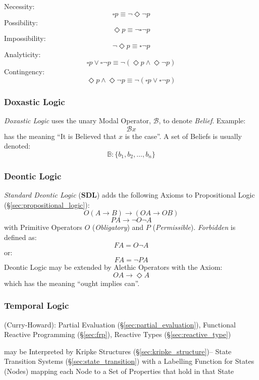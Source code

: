 Necessity:
\[
  \square p \equiv \neg \Diamond \neg p
\]
Possibility:
\[
  \Diamond p \equiv \neg \square \neg p
\]
Impossibility:
\[
  \neg \Diamond p \equiv \square \neg p
\]
Analyticity:
\[
  \square p \vee \square \neg p
  \equiv \neg (\Diamond p \wedge \Diamond \neg p)
\]
Contingency:
\[
  \Diamond p \wedge \Diamond \neg p
  \equiv \neg (\square p \vee \square \neg p)
\]



\subsubsection{Doxastic Logic}\label{sec:doxastic_logic}

\emph{Doxastic Logic} uses the unary Modal Operator, $\mathcal{B}$, to
denote \emph{Belief}. Example:
\[
  \mathcal{B} x
\]
has the meaning ``It is Believed that $x$ is the case''. A set of
Beliefs is usually denoted:
\[
  \mathbb{B}: \{ b_1, b_2, \ldots, b_n \}
\]



\subsubsection{Deontic Logic}\label{sec:deontic_logic}

\emph{Standard Deontic Logic} ($\mathbf{SDL}$) adds the following
Axioms to Propositional Logic (\S\ref{sec:propositional_logic}):
\[
  O(A \rightarrow B) \rightarrow (OA \rightarrow OB)
\]
\[
  PA \rightarrow \neg O \neg A
\]
with Primitive Operators $O$ (\emph{Obligatory}) and $P$
(\emph{Permissible}). \emph{Forbidden} is defined as:
\[
  FA = O \neg A
\]
or:
\[
  FA = \neg P A
\]
Deontic Logic may be extended by Alethic Operators with the Axiom:
\[
  OA \rightarrow \Diamond A
\]
which has the meaning ``ought implies can''.



\subsubsection{Temporal Logic}\label{sec:temporal_logic}

(Curry-Howard): Partial Evaluation (\S\ref{sec:partial_evaluation}),
Functional Reactive Programming (\S\ref{sec:frp}), Reactive Types
(\S\ref{sec:reactive_type})

may be Interpreted by Kripke Structures
(\S\ref{sec:kripke_structure})-- State Transition Systems
(\S\ref{sec:state_transition}) with a Labelling Function for States
(Nodes) mapping each Node to a Set of Properties that hold in that
State

